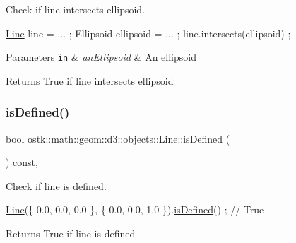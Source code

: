 Check if line intersects ellipsoid. 


\begin{DoxyCode}
\hyperlink{classostk_1_1math_1_1geom_1_1d3_1_1objects_1_1_line_a9ebdaaf67a4bd91780808f8683463ebe}{Line} line = ... ;
Ellipsoid ellipsoid = ... ;
line.intersects(ellipsoid) ;
\end{DoxyCode}



\begin{DoxyParams}[1]{Parameters}
\mbox{\tt in}  & {\em an\+Ellipsoid} & An ellipsoid \\
\hline
\end{DoxyParams}
\begin{DoxyReturn}{Returns}
True if line intersects ellipsoid 
\end{DoxyReturn}
\mbox{\label{classostk_1_1math_1_1geom_1_1d3_1_1objects_1_1_line_a092640b8e18d71c734185f326698f518}} 
\subsubsection{\texorpdfstring{is\+Defined()}{isDefined()}}
{\footnotesize\ttfamily bool ostk\+::math\+::geom\+::d3\+::objects\+::\+Line\+::is\+Defined (\begin{DoxyParamCaption}{ }\end{DoxyParamCaption}) const\hspace{0.3cm}{\ttfamily [override]}, {\ttfamily [virtual]}}



Check if line is defined. 


\begin{DoxyCode}
\hyperlink{classostk_1_1math_1_1geom_1_1d3_1_1objects_1_1_line_a9ebdaaf67a4bd91780808f8683463ebe}{Line}(\{ 0.0, 0.0, 0.0 \}, \{ 0.0, 0.0, 1.0 \}).\hyperlink{classostk_1_1math_1_1geom_1_1d3_1_1objects_1_1_line_a092640b8e18d71c734185f326698f518}{isDefined}() ; \textcolor{comment}{// True}
\end{DoxyCode}


\begin{DoxyReturn}{Returns}
True if line is defined 
\end{DoxyReturn}


